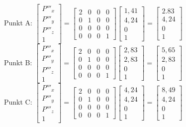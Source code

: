 \documentclass[11pt, a4paper]{article} %
\begin{document}
Punkt A: $\begin{bmatrix}
	P'''_x \\ P'''_y \\ P'''_z \\ 1
\end{bmatrix} = \begin{bmatrix}
	2 & 0 & 0 & 0 \\ 0 & 1 & 0 & 0 \\ 0 & 0 & 0 & 0 \\ 0 & 0 & 0 & 1
\end{bmatrix} \begin{bmatrix}
	1,41 \\ 4,24 \\ 0 \\ 1
\end{bmatrix} = \begin{bmatrix}
2.83 \\ 4,24 \\ 0 \\ 1
\end{bmatrix}$ \\
Punkt B: $\begin{bmatrix}
	P'''_x \\ P'''_y \\ P'''_z \\ 1
\end{bmatrix} = \begin{bmatrix}
	2 & 0 & 0 & 0 \\ 0 & 1 & 0 & 0 \\ 0 & 0 & 0 & 0 \\ 0 & 0 & 0 & 1
\end{bmatrix} \begin{bmatrix}
	2,83 \\ 2,83 \\ 0 \\ 1
\end{bmatrix} = \begin{bmatrix}
	5,65 \\ 2,83 \\ 0 \\ 1
\end{bmatrix}$ \\
Punkt C: $\begin{bmatrix}
	P'''_x \\ P'''_y \\ P'''_z \\ 1
\end{bmatrix} = \begin{bmatrix}
	2 & 0 & 0 & 0 \\ 0 & 1 & 0 & 0 \\ 0 & 0 & 0 & 0 \\ 0 & 0 & 0 & 1
\end{bmatrix} \begin{bmatrix}
	4,24 \\ 4,24 \\ 0 \\ 1
\end{bmatrix} = \begin{bmatrix}
	8,49 \\ 4,24 \\ 0 \\ 1
\end{bmatrix}$ \\
\end{document}
